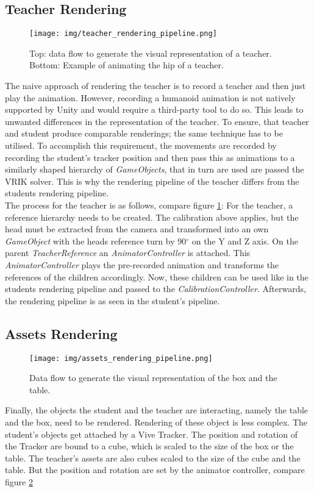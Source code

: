 \subsection{Teacher Rendering}
\begin{figure}
	\centering
	\texttt{[image: img/teacher\_rendering\_pipeline.png]}
	\caption{Top: data flow to generate the visual representation of a teacher. Bottom: Example of animating the hip of a teacher.}
	\label{fig:teacher_rendering_pipeline}
\end{figure}
The naive approach of rendering the teacher is to record a teacher and then just play the animation. However, recording a humanoid animation is not natively supported by Unity and would require a third-party tool to do so. This leads to unwanted differences in the representation of the teacher. To ensure, that teacher and student produce comparable renderings; the same technique has to be utilised. To accomplish this requirement, the movements are recorded by recording the student's tracker position and then pass this as animations to a similarly shaped hierarchy of \textit{GameObjects}, that in turn are used are passed the VRIK solver. This is why the rendering pipeline of the teacher differs from the students rendering pipeline.\\
The process for the teacher is as follows, compare figure \ref{fig:teacher_rendering_pipeline}:
For the teacher, a reference hierarchy needs to be created. The calibration above applies, but the head must be extracted from the camera and transformed into an own \textit{GameObject} with the heads reference turn by 90$^\circ$ on the Y and Z axis. On the parent \textit{TeacherReference} an \textit{AnimatorController} is attached. This \textit{AnimatorController} plays the pre-recorded animation and transforms the references of the children accordingly. Now, these children can be used like in the students rendering pipeline and passed to the \textit{CalibrationController}. Afterwards, the rendering pipeline is as seen in the student's pipeline.

\subsection{Assets Rendering}
\begin{figure}
	\centering
	\texttt{[image: img/assets\_rendering\_pipeline.png]}
	\caption{Data flow to generate the visual representation of the box and the table.}
	\label{fig:asset_rendering_pipeline}
\end{figure}
Finally, the objects the student and the teacher are interacting, namely the table and the box, need to be rendered. Rendering of these object is less complex. The student's objects get attached by a Vive Tracker. The position and rotation of the Tracker are bound to a cube, which is scaled to the size of the box or the table. The teacher's assets are also cubes scaled to the size of the cube and the table. But the position and rotation are set by the animator controller, compare figure \ref{fig:asset_rendering_pipeline}
